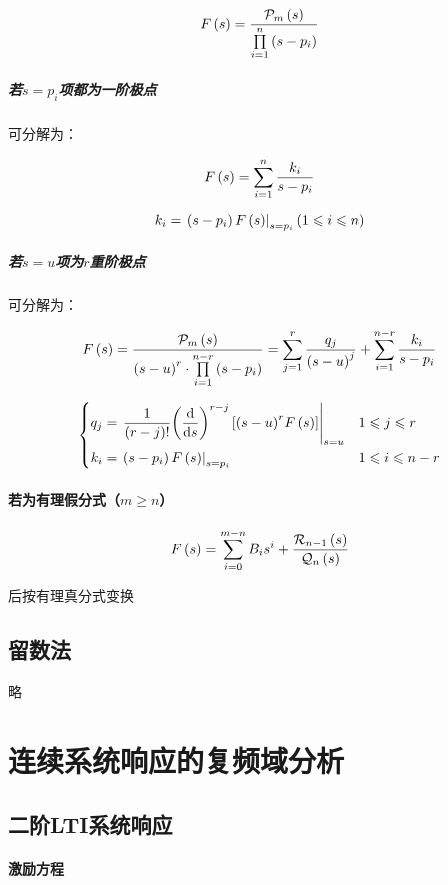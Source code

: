 \documentclass{article}
\begin{document}
\[F\left(s\right)=\frac{\mathcal P_m\left(s\right)}{\prod\limits_{i=1}^n\left(s-p_i\right)}\]

\subparagraph{若$s=p_i$项都为一阶极点}

可分解为：

\[F\left(s\right)=\sum_{i=1}^n\frac{k_i}{s-p_i}\]

\[k_i=\left.\left(s-p_i\right)F\left(s\right)\right|_{s=p_i}\left(1\leqslant i\leqslant n\right)\]

\subparagraph{若$s=u$项为$r$重阶极点}

可分解为：

\[F\left(s\right)=\frac{\mathcal P_m\left(s\right)}{{\left(s-u\right)}^r\cdot\prod\limits_{i=1}^{n-r}\left(s-p_i\right)}
    =\sum_{j=1}^r\frac{q_j}{{\left(s-u\right)}^j}+\sum_{i=1}^{n-r}\frac{k_i}{s-p_i}\]

\[\left\{\begin{aligned}
        q_j & =\left.\frac1{\left(r-j\right)!}{\left(\frac{\mathrm d}{\mathrm d s}\right)}^{r-j}\left[{\left(s-u\right)}^rF\left(s\right)\right]\right|_{s=u} &  & 1\leqslant j\leqslant r   \\
        k_i & =\left.\left(s-p_i\right)F\left(s\right)\right|_{s=p_i}                                                             &  & 1\leqslant i\leqslant n-r
    \end{aligned}\right.\]

\paragraph{若为有理假分式（$m\geqslant n$）}

\[F\left(s\right)=\sum_{i=0}^{m-n}B_is^i+\frac{\mathcal R_{n-1}\left(s\right)}{\mathcal Q_n\left(s\right)}\]

后按有理真分式变换

\subsection{留数法}

略

\section{连续系统响应的复频域分析}

\subsection{二阶LTI系统响应}

\paragraph{激励方程}
\end{document}

